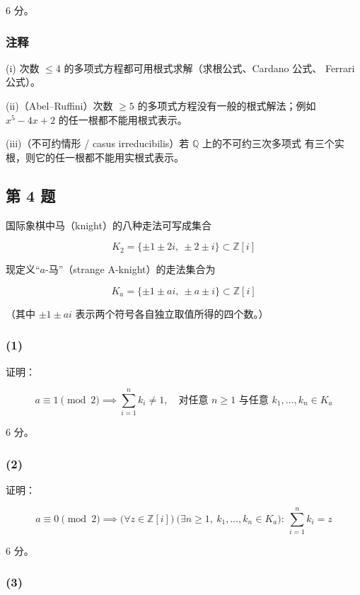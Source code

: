 \documentclass[UTF8]{ctexart}
\begin{document}
6 分。

\subsubsection*{注释}

(i) 次数 $\le4$ 的多项式方程都可用根式求解（求根公式、Cardano 公式、
Ferrari 公式）。

(ii)（Abel--Ruffini）次数 $\ge5$ 的多项式方程没有一般的根式解法；例如
$x^5-4x+2$ 的任一根都不能用根式表示。

(iii)（不可约情形 / casus irreducibilis）若 $\mathbb{Q}$ 上的不可约三次多项式
有三个实根，则它的任一根都不能用实根式表示。

\subsection{第 4 题}

国际象棋中马（knight）的八种走法可写成集合

$$K_2=\{\pm1\pm 2i,\ \pm 2 \pm i\}\subset\mathbb{Z}[i]$$

现定义``$a$-马''（strange A-knight）的走法集合为

$$K_a=\{\pm1\pm ai,\ \pm a \pm i\}\subset\mathbb{Z}[i]$$

（其中 $\pm1\pm ai$ 表示两个符号各自独立取值所得的四个数。）

\subsubsection{(1)}

证明：

$$a \equiv 1 \pmod{2}\implies\sum_{i=1}^n k_i\neq 1,
\quad\text{对任意 } n\ge 1 \text{ 与任意 } k_1,\ldots,k_n\in K_a$$

6 分。

\subsubsection{(2)}

证明：

$$a \equiv 0 \pmod{2}\implies
\bigl(\forall z\in\mathbb{Z}[i]\bigr)\ \bigl(\exists n\ge 1,\ 
k_1,\ldots,k_n\in K_a\bigr):\ \sum_{i=1}^n k_i=z$$

6 分。

\subsubsection{(3)}
\end{document}
